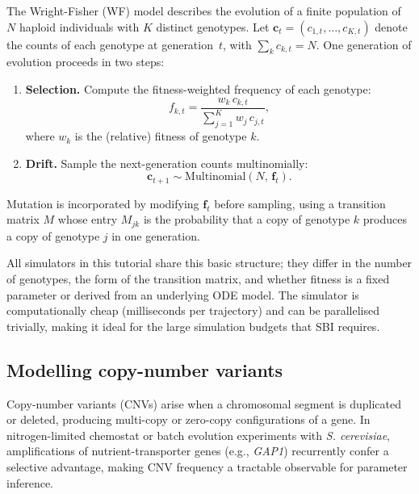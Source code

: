 \documentclass[11pt]{article}
\begin{document}
The Wright-Fisher (WF) model describes the evolution of a finite population
of $N$ haploid individuals with $K$ distinct genotypes.
Let $\mathbf{c}_t = (c_{1,t},\ldots,c_{K,t})$ denote the counts of each
genotype at generation~$t$, with $\sum_k c_{k,t} = N$.
One generation of evolution proceeds in two steps:
\begin{enumerate}
  \item \textbf{Selection.} Compute the fitness-weighted frequency of each
        genotype:
        \begin{equation}
          f_{k,t} = \frac{w_k \, c_{k,t}}{\sum_{j=1}^{K} w_j \, c_{j,t}},
          \label{eq:selection}
        \end{equation}
        where $w_k$ is the (relative) fitness of genotype $k$.
  \item \textbf{Drift.} Sample the next-generation counts multinomially:
        \begin{equation}
          \mathbf{c}_{t+1} \sim \mathrm{Multinomial}(N,\, \mathbf{f}_t).
          \label{eq:drift}
        \end{equation}
\end{enumerate}
Mutation is incorporated by modifying $\mathbf{f}_t$ before sampling, using
a transition matrix $M$ whose entry $M_{jk}$ is the probability that a copy
of genotype $k$ produces a copy of genotype $j$ in one generation.

All simulators in this tutorial share this basic structure; they differ in
the number of genotypes, the form of the transition matrix, and whether
fitness is a fixed parameter or derived from an underlying ODE model.
The simulator is computationally cheap (milliseconds per trajectory) and
can be parallelised trivially, making it ideal for the large simulation
budgets that SBI requires.

\subsection{Modelling copy-number variants}
\label{sec:cnv_models}

Copy-number variants (CNVs) arise when a chromosomal segment is duplicated or
deleted, producing multi-copy or zero-copy configurations of a gene.
In nitrogen-limited chemostat or batch evolution experiments with
\emph{S. cerevisiae}, amplifications of nutrient-transporter genes (e.g.,
\emph{GAP1}) recurrently confer a selective advantage, making CNV frequency a
tractable observable for parameter inference.
\end{document}
